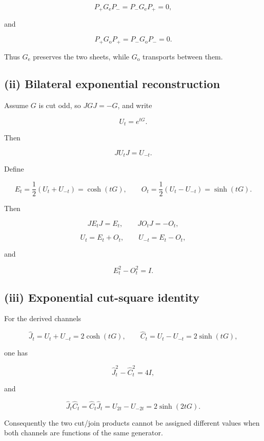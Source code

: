 \[
P_+G_{\mathrm e}P_-=P_-G_{\mathrm e}P_+=0,
\tag{3.4}
\]

and

\[
P_+G_{\mathrm o}P_+=P_-G_{\mathrm o}P_-=0.
\tag{3.5}
\]

Thus \(G_{\mathrm e}\) preserves the two sheets, while \(G_{\mathrm o}\)
transports between them.

\hypertarget{ii-bilateral-exponential-reconstruction}{%
\subsection{(ii) Bilateral exponential reconstruction}\label{ii-bilateral-exponential-reconstruction}}

Assume \(G\) is cut odd, so \(JGJ=-G\), and write

\[
U_t=e^{tG}.
\]

Then

\[
\boxed{JU_tJ=U_{-t}.}
\tag{3.6}
\]

Define

\[
E_t=\frac12(U_t+U_{-t})=\cosh(tG),
\qquad
O_t=\frac12(U_t-U_{-t})=\sinh(tG).
\tag{3.7}
\]

Then

\[
JE_tJ=E_t,
\qquad
JO_tJ=-O_t,
\tag{3.8}
\]

\[
\boxed{
U_t=E_t+O_t,
\qquad
U_{-t}=E_t-O_t,
}
\tag{3.9}
\]

and

\[
\boxed{E_t^2-O_t^2=I.}
\tag{3.10}
\]

\hypertarget{iii-exponential-cut-square-identity}{%
\subsection{(iii) Exponential cut-square identity}\label{iii-exponential-cut-square-identity}}

For the derived channels

\[
\widehat J_t=U_t+U_{-t}=2\cosh(tG),
\qquad
\widehat C_t=U_t-U_{-t}=2\sinh(tG),
\tag{3.11}
\]

one has

\[
\boxed{\widehat J_t^2-\widehat C_t^2=4I,}
\tag{3.12}
\]

and

\[
\boxed{
\widehat J_t\widehat C_t
=
\widehat C_t\widehat J_t
=
U_{2t}-U_{-2t}
=
2\sinh(2tG).
}
\tag{3.13}
\]

Consequently the two cut/join products cannot be assigned different values
when both channels are functions of the same generator.

